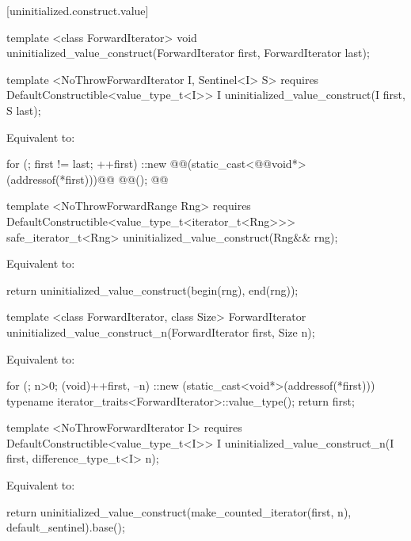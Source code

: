[uninitialized.construct.value]{}
{\color{remclr}
\begin{codeblock}
template <class ForwardIterator>
  void uninitialized_value_construct(ForwardIterator first, ForwardIterator last);
\end{codeblock}
} %
{\color{addclr}
\begin{codeblock}
template <NoThrowForwardIterator I, Sentinel<I> S>
  requires
DefaultConstructible<value_type_t<I>>
  I uninitialized_value_construct(I first, S last);
\end{codeblock}
} %

\setcounter{Paras}{0}
\pnum
\effects Equivalent to:

\begin{codeblock}
    for (; first != last; ++first)
      ::new @@(static_cast<@@void*>(addressof(*first)))@\added{)}@
        @@();
    @@
\end{codeblock}

{\color{addclr}
\begin{codeblock}
template <NoThrowForwardRange Rng>
requires
  DefaultConstructible<value_type_t<iterator_t<Rng>>>
safe_iterator_t<Rng> uninitialized_value_construct(Rng&& rng);
\end{codeblock}

\pnum
\effects Equivalent to:
\begin{codeblock}
    return uninitialized_value_construct(begin(rng), end(rng));
\end{codeblock}
} %

{\color{remclr}
\begin{codeblock}
template <class ForwardIterator, class Size>
  ForwardIterator uninitialized_value_construct_n(ForwardIterator first, Size n);
\end{codeblock}
\setcounter{Paras}{1}
\pnum
\effects Equivalent to:
\begin{codeblock}
        for (; n>0; (void)++first, --n)
          ::new (static_cast<void*>(addressof(*first)))
            typename iterator_traits<ForwardIterator>::value_type();
        return first;
\end{codeblock}
} %

{\color{addclr}
\begin{codeblock}
template <NoThrowForwardIterator I>
  requires
DefaultConstructible<value_type_t<I>>
  I uninitialized_value_construct_n(I first, difference_type_t<I> n);
\end{codeblock}

\pnum
\effects Equivalent to:
\begin{codeblock}
    return uninitialized_value_construct(make_counted_iterator(first, n),
                                         default_sentinel{}).base();
\end{codeblock}
} %

